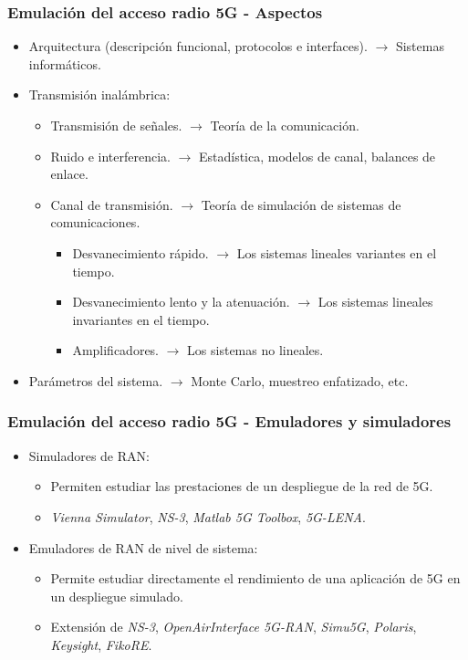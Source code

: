 \documentclass{beamer}
\begin{document}
\begin{frame}
\frametitle{Emulación del acceso radio 5G - Aspectos}

\begin{itemize}
\item Arquitectura (descripción funcional, protocolos e interfaces). $\rightarrow$ Sistemas informáticos.
\item {
	Transmisión inalámbrica:
	\begin{itemize}
	\item Transmisión de señales. $\rightarrow$ Teoría de la comunicación.
	\item Ruido e interferencia. $\rightarrow$ Estadística, modelos de canal, balances de enlace.
	\item {
		Canal de transmisión. $\rightarrow$ Teoría de simulación de sistemas de comunicaciones.
		\begin{itemize}
		\item Desvanecimiento rápido. $\rightarrow$ Los sistemas lineales variantes en el tiempo.
		\item Desvanecimiento lento y la atenuación. $\rightarrow$ Los sistemas lineales invariantes en el tiempo.
		\item Amplificadores. $\rightarrow$ Los sistemas no lineales.
		\end{itemize}
	}
	\end{itemize}
}
\item Parámetros del sistema. $\rightarrow$ Monte Carlo, muestreo enfatizado, etc.
\end{itemize}
\end{frame}

\begin{frame}
\frametitle{Emulación del acceso radio 5G - Emuladores y simuladores}

\begin{itemize}
\item {
	Simuladores de RAN:
	\begin{itemize}
	\item Permiten estudiar las prestaciones de un despliegue de la red de 5G.
	\item \textit{Vienna Simulator}, \textit{NS-3}, \textit{Matlab 5G Toolbox}, \textit{5G-LENA}.
	\end{itemize}
}
\item {
	Emuladores de RAN de nivel de sistema:
	\begin{itemize}
	\item Permite estudiar directamente el rendimiento de una aplicación de 5G en un despliegue simulado.
	\item Extensión de \textit{NS-3}, \textit{OpenAirInterface 5G-RAN}, \textit{Simu5G}, \textit{Polaris}, \textit{Keysight}, \textit{FikoRE}.
	\end{itemize}
}
\end{itemize}
\end{frame}
\end{document}
